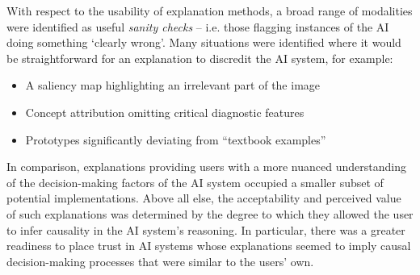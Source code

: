 

With respect to the usability of explanation methods, a broad range of modalities were identified as useful \textit{sanity checks} -- i.e. those flagging instances of the AI doing something `clearly wrong'. Many situations were identified where it would be straightforward for an explanation to discredit the AI system, for example: 

\begin{itemize}
    \item A saliency map highlighting an irrelevant part of the image
    \item Concept attribution omitting critical diagnostic features
    \item Prototypes significantly deviating from ``textbook examples''
\end{itemize}


In comparison, explanations providing users with a more nuanced understanding of the decision-making factors of the AI system occupied a smaller subset of potential implementations. Above all else, the acceptability and perceived value of such explanations was determined by the degree to which they allowed the user to infer causality in the AI system's reasoning. In particular, there was a greater readiness to place trust in AI systems whose explanations seemed to imply causal decision-making processes that were similar to the users' own.


